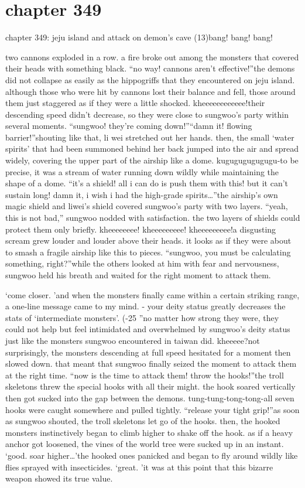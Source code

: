 \section{chapter 349}

chapter 349: jeju island and attack on demon’s cave (13)bang! bang! bang!




two cannons exploded in a row.
 a fire broke out among the monsters that covered their heads with something black.
“no way! cannons aren’t effective!”the demons did not collapse as easily as the hippogriffs that they encountered on jeju island.
although those who were hit by cannons lost their balance and fell, those around them just staggered as if they were a little shocked.
kheeeeeeeeeeee!their descending speed didn’t decrease, so they were close to sungwoo’s party within several moments.
“sungwoo! they’re coming down!”“damn it! flowing barrier!”shouting like that, li wei stretched out her hands.
 then, the small ‘water spirits’ that had been summoned behind her back jumped into the air and spread widely, covering the upper part of the airship like a dome.
kugugugugugugu-to be precise, it was a stream of water running down wildly while maintaining the shape of a dome.
“it’s a shield! all i can do is push them with this! but it can’t sustain long! damn it, i wish i had the high-grade spirits…”the airship’s own magic shield and liwei’s shield covered sungwoo’s party with two layers.
“yeah, this is not bad,” sungwoo nodded with satisfaction.
 the two layers of shields could protect them only briefly.
kheeeeeeee! kheeeeeeeee! kheeeeeeeee!a disgusting scream grew louder and louder above their heads.
 it looks as if they were about to smash a fragile airship like this to pieces.
“sungwoo, you must be calculating something, right?”while the others looked at him with fear and nervousness, sungwoo held his breath and waited for the right moment to attack them.

‘come closer.
’and when the monsters finally came within a certain striking range, a one-line message came to my mind.
- your deity status greatly decreases the stats of ‘intermediate monsters’.
 (-25%
”no matter how strong they were, they could not help but feel intimidated and overwhelmed by sungwoo’s deity status just like the monsters sungwoo encountered in taiwan did.
kheeeee?not surprisingly, the monsters descending at full speed hesitated for a moment then slowed down.
 that meant that sungwoo finally seized the moment to attack them at the right time.
“now is the time to attack them! throw the hooks!”the troll skeletons threw the special hooks with all their might.
 the hook soared vertically then got sucked into the gap between the demons.
tung-tung-tong-tong-all seven hooks were caught somewhere and pulled tightly.
“release your tight grip!”as soon as sungwoo shouted, the troll skeletons let go of the hooks.
 then, the hooked monsters instinctively began to climb higher to shake off the hook.
as if a heavy anchor got loosened, the vines of the world tree were sucked up in an instant.
‘good.
 soar higher…’the hooked ones panicked and began to fly around wildly like flies sprayed with insecticides.
‘great.
’it was at this point that this bizarre weapon showed its true value.

